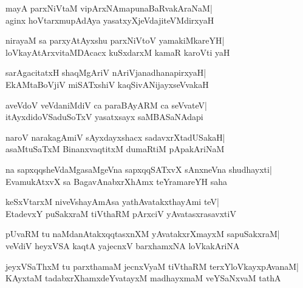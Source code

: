 \documentclass[twoside,12pt,openright]{book}
\newcounter{shloka}[chapter]
\begin{document}
\begin{shloka}%
mayA parxNiVtaM vipArxNAmapunaBaRvakAraNaM|\\
aginx hoVtarxmupAdAya yasatxyXjeVdajiteVMdirxyaH
\end{shloka}

\begin{shloka}%
nirayaM sa parxyAtAyxshu parxNiVtoV yamakiMkareYH|\\
loVkayAtArxvitaMDAcacx kuSxdarxM kamaR karoVti yaH
\end{shloka}

\begin{shloka}%
sarAgacitatxH shaqMgAriV nAriVjanadhanapirxyaH|\\
EkAMtaBoVjiV miSATxshiV kaqSivANijayxseVvakaH
\end{shloka}

\begin{shloka}%
aveVdoV veVdaniMdiV ca paraBAyARM ca seVvateV|\\
itAyxdidoVSaduSoTxV yasatxsayx saMBASaNAdapi
\end{shloka}

\begin{shloka}%
naroV narakagAmiV sAyxdayxshacx sadavxrXtadUSakaH|\\
asaMtuSaTxM BinanxvaqtitxM dumaRtiM pApakAriNaM
\end{shloka}

\begin{shloka}%
na sapxqqsheVdaMgasaMgeVna sapxqqSATxvX sAnxneVna shudhayxti|\\
EvamukAtxvX sa BagavAnabxrXhAmx teYramareYH saha
\end{shloka}

\begin{shloka}%
keSxVtarxM niveVshayAmAsa yathAvatakxthayAmi teV|\\
EtadevxY puSakxraM tiVthaRM pArxciV yAvatasxrasavxtiV
\end{shloka}

\begin{shloka}%
pUvaRM tu naMdanAtakxqqtasxnXM yAvatakxrXmayxM sapuSakxraM|\\
veVdiV heyxVSA kaqtA yajecnxV barxhamxNA loVkakAriNA
\end{shloka}

\begin{shloka}%
jeyxVSaThxM tu parxthamaM jecnxVyaM tiVthaRM terxYloVkayxpAvanaM|\\
KAyxtaM tadabxrXhamxdeYvatayxM madhayxmaM veYSaNxvaM tathA
\end{shloka}
\end{document}
